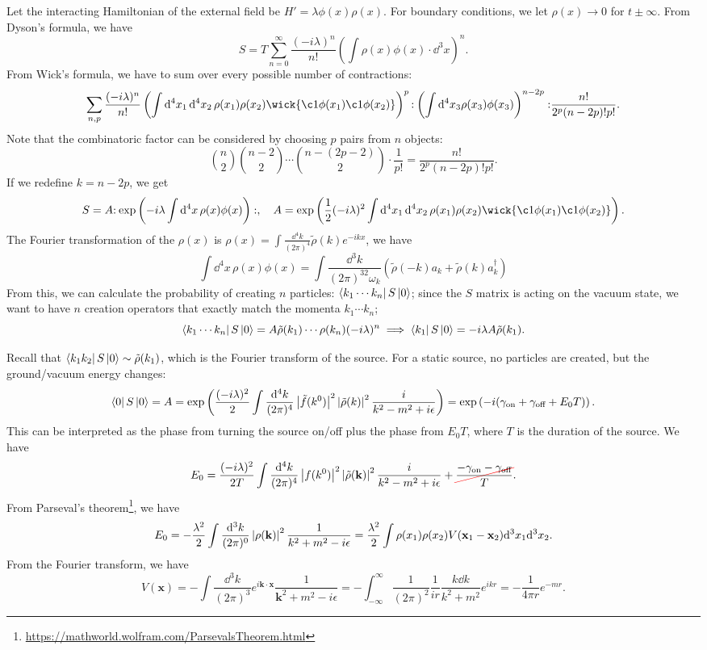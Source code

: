 \documentclass{article}
\begin{document}
Let the interacting Hamiltonian of the external field be $H'=\lambda\phi(x)\rho(x)$. For boundary conditions, we let $\rho(x)\to 0$ for $t\pm\infty$. From Dyson's formula, we have 
$$S=T\sum^\infty_{n=0}\frac{(-i\lambda)^n}{n!}\left(\int\rho(x)\phi(x)\cdot\dd^3x\right)^n.$$ 
From Wick's formula, we have to sum over every possible number of contractions:
$$\sum_{n,p}\frac{(-i\lambda)^n}{n!}\left(\int\dd^4x_1\,\dd^4x_2\,\rho(x_1)\rho(x_2)\wick{\c1\phi(x_1)\c1\phi(x_2)}\right)^p\normord{\left(\int\dd^4x_3\rho(x_3)\phi(x_3)\right)^{n-2p}}\frac{n!}{2^p(n-2p)!p!}.$$
Note that the combinatoric factor can be considered by choosing $p$ pairs from $n$ objects:
$$\binom n2\binom{n-2}2\cdots\binom{n-(2p-2)}2\cdot\frac 1{p!}=\frac{n!}{2^p(n-2p)!p!}.$$
If we redefine $k=n-2p$, we get 
$$S=A\normord{\exp\left(-i\lambda\int\dd^4x\,\rho(x)\phi(x)\right)},\quad A=\exp\left(\frac 12(-i\lambda)^2\int\dd^4x_1\,\dd^4x_2\,\rho(x_1)\rho(x_2)\wick{\c1\phi(x_1)\c1\phi(x_2)}\right).$$
The Fourier transformation of the $\rho(x)$ is $\rho(x)=\int\frac{\dd^4k}{(2\pi)^4}\tilde\rho(k)e^{-ikx}$, we have 
$$\int\dd^4x\,\rho(x)\phi(x)=\int\frac{\dd^3k}{(2\pi)^32\omega_k}(\tilde\rho(-k)a_k+\tilde\rho(k)a^\dag_k)$$
From this, we can calculate the probability of creating $n$ particles: $\bra{k_1\cdots k_n}S\ket 0$; since the $S$ matrix is acting on the vacuum state, we want to have $n$ creation operators that exactly match the momenta $k_1\cdots k_n$; 
$$\bra{k_1\cdots k_n}S\ket 0=A\tilde\rho(k_1)\cdots\rho(k_n)(-i\lambda)^n\implies\bra{k_1}S\ket 0=-i\lambda A\tilde\rho(k_1).$$

Recall that $\bra{k_1k_2}S\ket 0\sim\tilde\rho(k_1)$, which is the Fourier transform of the source. For a static source, no particles are created, but the ground/vacuum energy changes:
$$\bra 0S\ket 0=A=\exp\left(\frac{(-i\lambda)^2}{2}\int\frac{\dd^4k}{(2\pi)^4}\left\lvert\tilde f(k^0)\right\rvert^2\left\lvert\tilde\rho(k)\right\rvert^2\frac{i}{k^2-m^2+i\epsilon}\right)=\exp\left(-i(\gamma_\text{on}+\gamma_\text{off}+E_0T)\right).$$
This can be interpreted as the phase from turning the source on/off plus the phase from $E_0T$, where $T$ is the duration of the source. We have 
$$E_0=\frac{(-i\lambda)^2}{2T}\int\frac{\dd^4k}{(2\pi)^4}\abs{f(k^0)}^2\abs{\tilde\rho(\mathbf k)}^2\frac{i}{k^2-m^2+i\epsilon}+\Ccancel[red]{\frac{-\gamma_\text{on}-\gamma_\text{off}}{T}}.$$
From Parseval's theorem\footnote{\url{https://mathworld.wolfram.com/ParsevalsTheorem.html}}, we have 
$$E_0=-\frac{\lambda^2}{2}\int\frac{\dd^3k}{(2\pi)^0}\left\lvert\rho(\mathbf k)\right\rvert^2\frac 1{k^2+m^2-i\epsilon}=\frac{\lambda^2}2\int\rho(x_1)\rho(x_2)V(\mathbf x_1-\mathbf x_2)\dd^3x_1\dd^3x_2.$$
From the Fourier transform, we have 
$$V(\mathbf x)=-\int\frac{\dd^3k}{(2\pi)^3}e^{i\mathbf k\cdot\mathbf x}\frac 1{\mathbf k^2+m^2-i\epsilon}=-\int^\infty_{-\infty}\frac 1{(2\pi)^2}\frac 1{ir}\frac{k\dd k}{k^2+m^2}e^{ikr}=-\frac 1{4\pi r}e^{-mr}.$$
\end{document}
